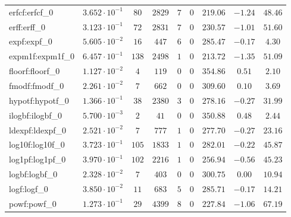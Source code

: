 \begin{tabular}{|l|c|c|c|c|c|c|c|c|}
erfcf:erfcf\_0               & $ 3.652 \cdot 10^{-1} $ & $ 80     $ & $ 2829  $ & $ 7   $ & $ 0   $ & $ 219.06      $ & $ -1.24   $ & $ 48.46   $ \\
erff:erff\_0                 & $ 3.123 \cdot 10^{-1} $ & $ 72     $ & $ 2831  $ & $ 7   $ & $ 0   $ & $ 230.57      $ & $ -1.01   $ & $ 51.60   $ \\
expf:expf\_0                 & $ 5.605 \cdot 10^{-2} $ & $ 16     $ & $ 447   $ & $ 6   $ & $ 0   $ & $ 285.47      $ & $ -0.17   $ & $ 4.30    $ \\
expm1f:expm1f\_0             & $ 6.457 \cdot 10^{-1} $ & $ 138    $ & $ 2498  $ & $ 1   $ & $ 0   $ & $ 213.72      $ & $ -1.35   $ & $ 51.09   $ \\
floorf:floorf\_0             & $ 1.127 \cdot 10^{-2} $ & $ 4      $ & $ 119   $ & $ 0   $ & $ 0   $ & $ 354.86      $ & $ 0.51    $ & $ 2.10    $ \\
fmodf:fmodf\_0               & $ 2.261 \cdot 10^{-2} $ & $ 7      $ & $ 662   $ & $ 0   $ & $ 0   $ & $ 309.60      $ & $ 0.10    $ & $ 3.69    $ \\
hypotf:hypotf\_0             & $ 1.366 \cdot 10^{-1} $ & $ 38     $ & $ 2380  $ & $ 3   $ & $ 0   $ & $ 278.16      $ & $ -0.27   $ & $ 31.99   $ \\
ilogbf:ilogbf\_0             & $ 5.700 \cdot 10^{-3} $ & $ 2      $ & $ 41    $ & $ 0   $ & $ 0   $ & $ 350.88      $ & $ 0.48    $ & $ 2.44    $ \\
ldexpf:ldexpf\_0             & $ 2.521 \cdot 10^{-2} $ & $ 7      $ & $ 777   $ & $ 1   $ & $ 0   $ & $ 277.70      $ & $ -0.27   $ & $ 23.16   $ \\
log10f:log10f\_0             & $ 3.723 \cdot 10^{-1} $ & $ 105    $ & $ 1833  $ & $ 1   $ & $ 0   $ & $ 282.01      $ & $ -0.22   $ & $ 45.87   $ \\
log1pf:log1pf\_0             & $ 3.970 \cdot 10^{-1} $ & $ 102    $ & $ 2216  $ & $ 1   $ & $ 0   $ & $ 256.94      $ & $ -0.56   $ & $ 45.23   $ \\
logbf:logbf\_0               & $ 2.328 \cdot 10^{-2} $ & $ 7      $ & $ 403   $ & $ 0   $ & $ 0   $ & $ 300.75      $ & $ 0.00    $ & $ 10.94   $ \\
logf:logf\_0                 & $ 3.850 \cdot 10^{-2} $ & $ 11     $ & $ 683   $ & $ 5   $ & $ 0   $ & $ 285.71      $ & $ -0.17   $ & $ 14.21   $ \\
powf:powf\_0                 & $ 1.273 \cdot 10^{-1} $ & $ 29     $ & $ 4399  $ & $ 8   $ & $ 0   $ & $ 227.84      $ & $ -1.06   $ & $ 67.19   $ \\

\end{tabular}
